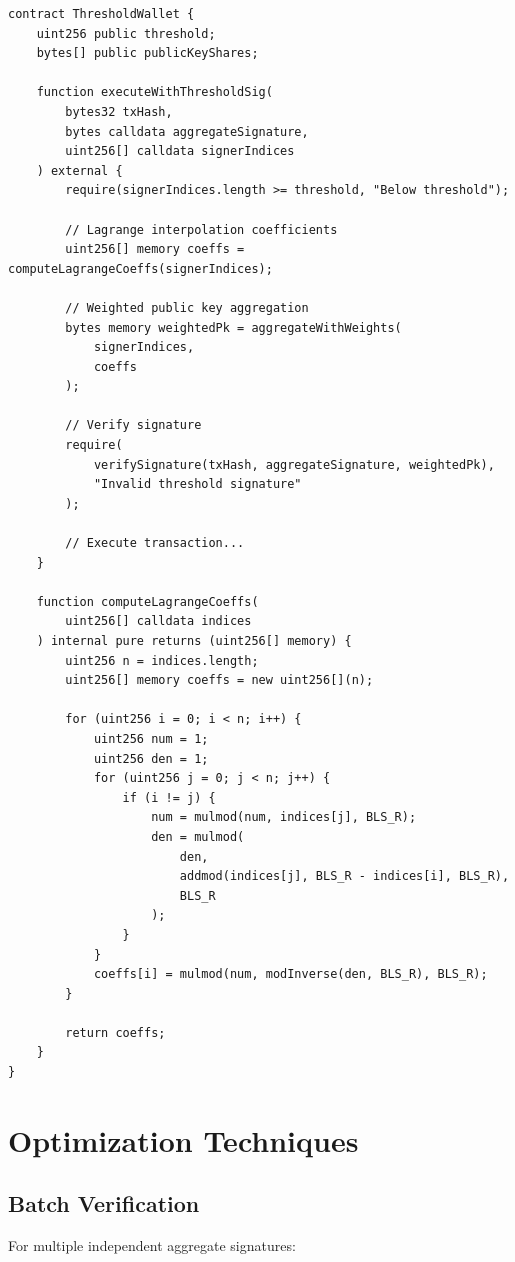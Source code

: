 \documentclass[11pt,a4paper]{article}
\theoremstyle{definition}
\begin{document}
\begin{lstlisting}[language=Solidity]
contract ThresholdWallet {
    uint256 public threshold;
    bytes[] public publicKeyShares;

    function executeWithThresholdSig(
        bytes32 txHash,
        bytes calldata aggregateSignature,
        uint256[] calldata signerIndices
    ) external {
        require(signerIndices.length >= threshold, "Below threshold");

        // Lagrange interpolation coefficients
        uint256[] memory coeffs = computeLagrangeCoeffs(signerIndices);

        // Weighted public key aggregation
        bytes memory weightedPk = aggregateWithWeights(
            signerIndices,
            coeffs
        );

        // Verify signature
        require(
            verifySignature(txHash, aggregateSignature, weightedPk),
            "Invalid threshold signature"
        );

        // Execute transaction...
    }

    function computeLagrangeCoeffs(
        uint256[] calldata indices
    ) internal pure returns (uint256[] memory) {
        uint256 n = indices.length;
        uint256[] memory coeffs = new uint256[](n);

        for (uint256 i = 0; i < n; i++) {
            uint256 num = 1;
            uint256 den = 1;
            for (uint256 j = 0; j < n; j++) {
                if (i != j) {
                    num = mulmod(num, indices[j], BLS_R);
                    den = mulmod(
                        den,
                        addmod(indices[j], BLS_R - indices[i], BLS_R),
                        BLS_R
                    );
                }
            }
            coeffs[i] = mulmod(num, modInverse(den, BLS_R), BLS_R);
        }

        return coeffs;
    }
}
\end{lstlisting}

\section{Optimization Techniques}

\subsection{Batch Verification}

For multiple independent aggregate signatures:
\end{document}
